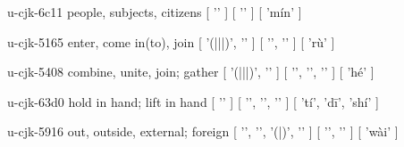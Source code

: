 \begin{multicols}{2}
\cjkgGlue{} u-cjk-6c11  people, subjects, citizens  [ '\cjkgGlue{}' ]  [ '\cjkgGlue{}' ]  [ 'mín' ] 

\cjkgGlue{} u-cjk-5165  enter, come in(to), join  [ '\cjkgGlue{}(\cjkgGlue{}|\cjkgGlue{}|\cjkgGlue{}|\cjkgGlue{})', '\cjkgGlue{}' ]  [ '\cjkgGlue{}', '\cjkgGlue{}' ]  [ 'rù' ] 

\cjkgGlue{} u-cjk-5408  combine, unite, join; gather  [ '\cjkgGlue{}(\cjkgGlue{}|\cjkgGlue{}|\cjkgGlue{}|\cjkgGlue{})', '\cjkgGlue{}' ]  [ '\cjkgGlue{}', '\cjkgGlue{}', '\cjkgGlue{}' ]  [ 'hé' ] 

\cjkgGlue{} u-cjk-63d0  hold in hand; lift in hand  [ '\cjkgGlue{}' ]  [ '\cjkgGlue{}', '\cjkgGlue{}', '\cjkgGlue{}' ]  [ 'tí', 'd{\mktsRsgFb{}ī}', 'shí' ] 

\cjkgGlue{} u-cjk-5916  out, outside, external; foreign  [ '\cjkgGlue{}', '\cjkgGlue{}', '\cjkgGlue{}(\cjkgGlue{}|\cjkgGlue{})', '\cjkgGlue{}' ]  [ '\cjkgGlue{}', '\cjkgGlue{}' ]  [ 'wài' ] 


\end{multicols}
